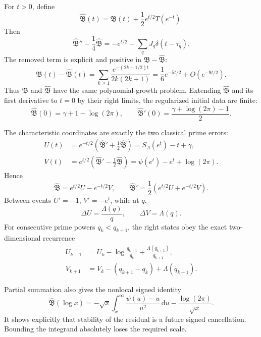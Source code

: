 \documentclass[11pt,a4paper]{article}
\numberwithin{equation}{section}
\theoremstyle{definition}
\newcommand{\dd}{\,\mathrm{d}}
\newcommand{\Bres}{\mathfrak B}
\newcommand{\Bhat}{\widehat{\mathfrak B}}
\begin{document}
For \(t>0\), define
\begin{equation}\label{eq:Bhat-def}
  \Bhat(t)=\Bres(t)+\frac12e^{t/2}T(e^{-t}).
\end{equation}
Then
\begin{equation}\label{eq:Bhat-ODE}
  \boxed{
  \Bhat''-\frac14\Bhat
  =-e^{t/2}+\sum_qJ_q\delta(t-\tau_q).
  }
\end{equation}
The removed term is explicit and positive in \(\Bres-\Bhat\):
\begin{equation}\label{eq:Bhat-correction}
  \Bres(t)-\Bhat(t)
  =\sum_{k\ge1}
  \frac{e^{-(2k+1/2)t}}{2k(2k+1)}
  =\frac16e^{-5t/2}+O(e^{-9t/2}).
\end{equation}
Thus \(\Bres\) and \(\Bhat\) have the same polynomial-growth problem.
Extending \(\Bhat\) and its first derivative to \(t=0\) by their right limits,
the regularized initial data are finite:
\[
  \Bhat(0)=\gamma+1-\log(2\pi),
  \qquad
  \Bhat'(0)=\frac{\gamma+\log(2\pi)-1}{2}.
\]

The characteristic coordinates are exactly the two classical prime errors:
\begin{align}
  U(t)&=e^{-t/2}\left(\Bhat'+\frac12\Bhat\right)
  =S_\Lambda(e^t)-t+\gamma,
  \label{eq:Bhat-U}\\
  V(t)&=e^{t/2}\left(\Bhat'-\frac12\Bhat\right)
  =\psi(e^t)-e^t+\log(2\pi).
  \label{eq:Bhat-V}
\end{align}
Hence
\begin{equation}\label{eq:Bhat-reconstruction}
  \Bhat=e^{t/2}U-e^{-t/2}V,
  \qquad
  \Bhat'=\frac12\left(e^{t/2}U+e^{-t/2}V\right).
\end{equation}
Between events \(U'=-1\), \(V'=-e^t\), while at \(q\),
\[
  \Delta U=\frac{\Lambda(q)}q,
  \qquad
  \Delta V=\Lambda(q).
\]
For consecutive prime powers \(q_k<q_{k+1}\), the right states obey the exact
two-dimensional recurrence
\begin{align}
  U_{k+1}&=U_k-\log\frac{q_{k+1}}{q_k}
  +\frac{\Lambda(q_{k+1})}{q_{k+1}},
  \label{eq:U-event-map}\\
  V_{k+1}&=V_k-(q_{k+1}-q_k)+\Lambda(q_{k+1}).
  \label{eq:V-event-map}
\end{align}

Partial summation also gives the nonlocal signed identity
\begin{equation}\label{eq:Bhat-future-tail}
  \boxed{
  \Bhat(\log x)
  =-\sqrt{x}\int_x^\infty\frac{\psi(u)-u}{u^2}\dd u
  -\frac{\log(2\pi)}{\sqrt{x}}.
  }
\end{equation}
It shows explicitly that stability of the residual is a future signed
cancellation.  Bounding the integrand absolutely loses the required scale.
\end{document}
